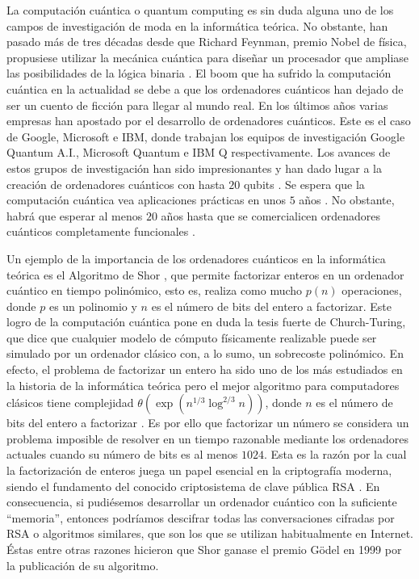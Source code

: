 \documentclass{article}
\begin{document}
La computación cuántica o quantum computing es sin duda alguna uno de los campos de investigación de moda en la informática teórica. No obstante, han pasado más de tres décadas desde que Richard Feynman, premio Nobel de física, propusiese utilizar la mecánica cuántica para diseñar un procesador que ampliase las posibilidades de la lógica binaria \cite{feynman}. El boom que ha sufrido la computación cuántica en la actualidad se debe a que los ordenadores cuánticos han dejado de ser un cuento de ficción para llegar al mundo real. En los últimos años varias empresas han apostado por el desarrollo de ordenadores cuánticos. Este es el caso de Google, Microsoft e IBM, donde trabajan los equipos de investigación Google Quantum A.I., Microsoft Quantum e IBM Q respectivamente. Los avances de estos grupos de investigación han sido impresionantes y han dado lugar a la creación de ordenadores cuánticos con hasta $20$ qubits \cite{quantum-lab, quantum-experimental, quantum-supremacy}. Se espera que la computación cuántica vea aplicaciones prácticas en unos $5$ años \cite{quantum-comercialize}. No obstante, habrá que esperar al menos $20$ años hasta que se comercialicen ordenadores cuánticos completamente funcionales \cite{quantum-manifesto}.


Un ejemplo de la importancia de los ordenadores cuánticos en la informática teórica es el Algoritmo de Shor \cite{shor}, que permite factorizar enteros en un ordenador cuántico en tiempo polinómico, esto es, realiza como mucho $p(n)$ operaciones, donde $p$ es un polinomio y $n$ es el número de bits del entero a factorizar. Este logro de la computación cuántica pone en duda la tesis fuerte de Church-Turing, que dice que cualquier modelo de cómputo físicamente realizable puede ser simulado por un ordenador clásico con, a lo sumo, un sobrecoste polinómico. En efecto, el problema de factorizar un entero ha sido uno de los más estudiados en la historia de la informática teórica pero el mejor algoritmo para computadores clásicos tiene complejidad $\theta\left(\exp(n^{1/3} \log^{2/3} n)\right)$, donde $n$ es el número de bits del entero a factorizar \cite[Capítulo 6]{primes}. Es por ello que factorizar un número se considera un problema imposible de resolver en un tiempo razonable mediante los ordenadores actuales cuando su número de bits es al menos $1024$. Esta es la razón por la cual la factorización de enteros juega un papel esencial en la criptografía moderna, siendo el fundamento del conocido criptosistema de clave pública RSA \cite{koblitz}. En consecuencia, si pudiésemos desarrollar un ordenador cuántico con la suficiente ``memoria'', entonces podríamos descifrar todas las conversaciones cifradas por RSA o algoritmos similares, que son los que se utilizan habitualmente en Internet. Éstas entre otras razones hicieron que Shor ganase el premio G\"odel en 1999 por la publicación de su algoritmo.
\end{document}
